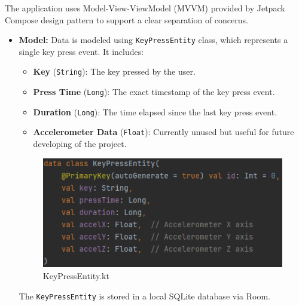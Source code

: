 The application uses Model-View-ViewModel (MVVM) provided by Jetpack Compose design pattern to support a clear separation of concerns. 
\begin{itemize}
	\item \textbf{Model:} Data is modeled using \texttt{KeyPressEntity} class, which represents a single key press event. It includes: 
	\begin{itemize}
		\item \textbf{Key} (\texttt{String}): The key pressed by the user.
		\item \textbf{Press Time} (\texttt{Long}): The exact timestamp of the key press event.
		\item \textbf{Duration} (\texttt{Long}): The time elapsed since the last key press event.
		\item \textbf{Accelerometer Data} (\texttt{Float}): Currently unused but useful for future developing of the project. 
	\end{itemize}
	\begin{figure}[H]
		\centering
		\includegraphics[width=0.8\linewidth]{images/DataModel.png}
		\caption{KeyPressEntity.kt}
		\label{fig:data_model_view}
	\end{figure}
	
	The \texttt{KeyPressEntity} is stored in a local SQLite database via Room.
	

\end{itemize}
